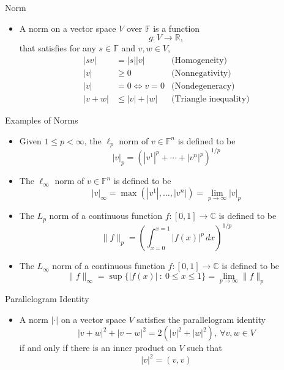 \documentclass[usenames,dvipsnames,10pt]{beamer}
\newcommand\C{\mathbb{C}}
\newcommand\F{\mathbb{F}}
\newcommand{\R}{\mathbb{R}}
\begin{document}
\begin{frame}
  {Norm}

  \begin{itemize}
  \item A norm on a vector space $V$ over $\F$ is a function
    \[
      g: V \rightarrow \R,
    \]
    that satisfies for any $s \in \F$ and $v,w\in V$,
    \begin{align*}
      |sv| &= |s||v| &\text{(Homogeneity)}\\
      |v| &\ge 0 &\text{(Nonnegativity)}\\
      |v| &= 0 \iff v = 0 &\text{(Nondegeneracy)}\\
      |v+w| &\le |v|+|w| &\text{(Triangle inequality)}
    \end{align*}
  \end{itemize}
\end{frame}

\begin{frame}
  {Examples of Norms}

  \begin{itemize}
  \item Given $1 \le p < \infty$, the $\ell_p$ norm of $v \in\F^n$ is defined to be
    \[
      |v|_p = (|v^1|^p+\cdots+|v^n|^p)^{1/p}
    \]
  \item The $\ell_\infty$ norm of $v \in\F^n$ is defined to be
    \[
      |v|_\infty = \max(|v^1|, \dots, |v^n|) = \lim_{p\rightarrow\infty}|v|_p
    \]
  \item The $L_p$ norm of a continuous function $f: [0,1]\rightarrow \C$ is defined to be
    \[
      \|f\|_p = \left(\int_{x=0}^{x=1}|f(x)|^p\,dx\right)^{1/p}
    \]
  \item The $L_\infty$ norm of a continuous function $f: [0,1] \rightarrow \C$ is defined to be
    \[
      \|f\|_\infty = \sup \{ |f(x)|\ :\ 0 \le x \le 1 \} = \lim_{p\rightarrow\infty}\|f\|_p
    \]
  \end{itemize}
\end{frame}

\begin{frame}
  {Parallelogram Identity}

  \begin{itemize}
  \item A norm $|\cdot|$ on a vector space $V$ satisfies the parallelogram identity
    \[
      |v+w|^2 + |v-w|^2 = 2(|v|^2+|w|^2),\ \forall v, w \in V
    \]
    if and only if there is an inner product on $V$ such that
    \[
      |v|^2 = (v,v)
    \]
  \end{itemize}
\end{frame}
\end{document}
